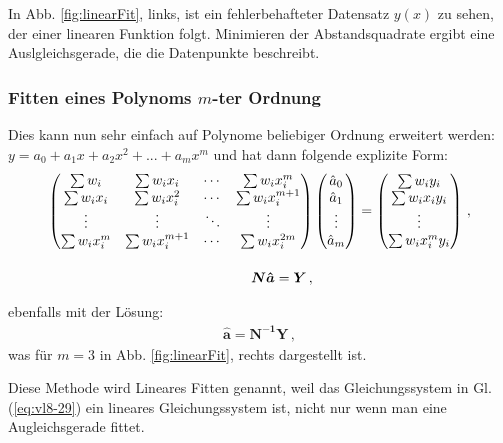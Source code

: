 In Abb. \ref{fig:linearFit}, links, ist ein fehlerbehafteter Datensatz $y(x)$ zu sehen, der einer linearen Funktion folgt. 
Minimieren der Abstandsquadrate ergibt eine Auslgleichsgerade, die die Datenpunkte beschreibt. 

\subsubsection{Fitten eines Polynoms \texorpdfstring{$m$}{m}-ter Ordnung}
\label{subsubsec:vl8-2}

Dies kann nun sehr einfach auf Polynome beliebiger Ordnung erweitert werden: $y = a_0 + a_1 x + a_2 x^2 + ... + a_m x^m$ und hat dann folgende explizite Form:
\begin{align}
\begin{pmatrix}
\sum w_i       & \sum w_i x_i       & \cdots & \sum w_i x_i^m     \\
\sum w_i x_i   & \sum w_i x_i^2     & \cdots & \sum w_i x_i^{m+1} \\
\vdots         & \vdots             & \ddots & \vdots             \\
\sum w_i x_i^m & \sum w_i x_i^{m+1} & \cdots & \sum w_i x_i^{2m}  
\end{pmatrix}
&
\begin{pmatrix}
\hat{a}_0 \\
\hat{a}_1 \\
\vdots    \\
\hat{a}_m
\end{pmatrix}
= 
\begin{pmatrix}
\sum w_i y_i       \\
\sum w_i x_i y_i   \\
\vdots             \\
\sum w_i x_i^m y_i
\end{pmatrix}\,,\\
\intertext{}
\boldsymbol{N \hat{a}} = \boldsymbol{Y}\,,
\label{eq:vl8-29}
\end{align}

ebenfalls mit der L\"osung:
\begin{align}
\boldsymbol{\hat{a}} = \boldsymbol{N^{-1} Y}\, ,    
\label{eq:vl8-29-2}
\end{align}
was für $m=3$ in Abb. \ref{fig:linearFit}, rechts dargestellt ist. 


\begin{center}
\begin{tcolorbox}[enhanced,width=6in,drop fuzzy shadow southwest,
    colframe=red!50!black,colback=red!05]
   Diese Methode wird Lineares Fitten genannt, weil das Gleichungssystem in Gl. (\ref{eq:vl8-29}) ein lineares Gleichungssystem ist, nicht nur wenn man eine Augleichsgerade fittet. 
\end{tcolorbox}
\end{center}


